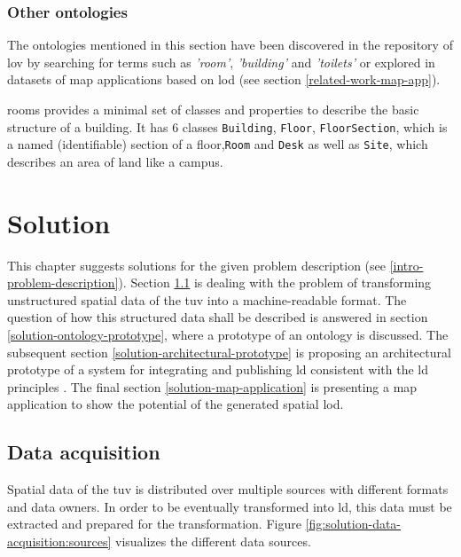 \documentclass[draft,final]{vutinfth} %
\begin{document}
\subsection{Other ontologies}
\label{related-work-indoor-modelling-other-ontologies}
The ontologies mentioned in this section have been discovered in the repository of \gls{lov} by searching for terms such as \textit{'room'}, \textit{'building'} and \textit{'toilets'} or explored in datasets of map applications based on \gls{lod} (see section \ref{related-work-map-app}).

\gls{rooms} provides a minimal set of classes and properties to describe the basic structure of a building. It has 6 classes \texttt{Building}, \texttt{Floor}, \texttt{FloorSection}, which is a named (identifiable) section of a floor,\texttt{Room} and \texttt{Desk} as well as \texttt{Site}, which describes an area of land like a campus.

\chapter{Solution}
\label{solution-chapter}

This chapter suggests solutions for the given problem description (see \ref{intro-problem-description}). Section \ref{solution-data-acquisition} is dealing with the problem of transforming unstructured spatial data of the \gls{tuv} into a machine-readable format. The question of how this structured data shall be described is answered in section \ref{solution-ontology-prototype}, where a prototype of an ontology is discussed. The subsequent section \ref{solution-architectural-prototype} is proposing an architectural prototype of a system for integrating and publishing \gls{ld} consistent with the \gls{ld} principles \cite{berners-lee_linked_2009}. The final section \ref{solution-map-application} is presenting a map application to show the potential of the generated spatial \gls{lod}.

\section{Data acquisition}
\label{solution-data-acquisition}
Spatial data of the \gls{tuv} is distributed over multiple sources with different formats and data owners. In order to be eventually transformed into \gls{ld}, this data must be extracted and prepared for the transformation. Figure \ref{fig:solution-data-acquisition:sources} visualizes the different data sources.
\end{document}
